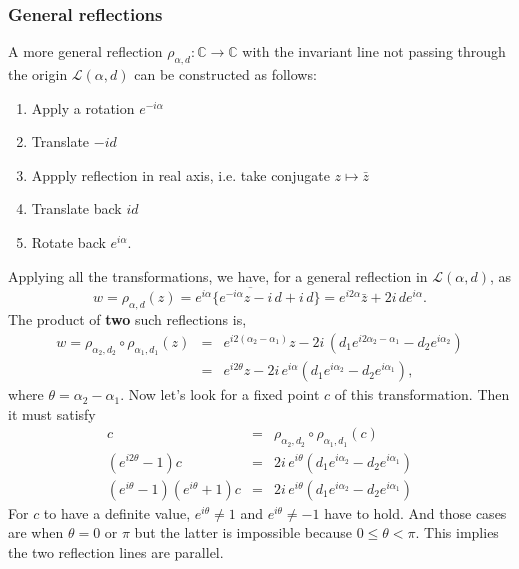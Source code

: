 \documentclass{article}
\begin{document}
\subsubsection{General reflections}
\label{sec:org0e04d08}
A more general reflection \(\rho_{\alpha,d}:\mathbb{C} \rightarrow \mathbb{C}\) with the invariant line not passing through the origin \(\mathcal{L}(\alpha, d)\) can be constructed as follows:
\begin{enumerate}
\item Apply a rotation \(e^{-i\alpha}\)
\item Translate \(-id\)
\item Appply reflection in real axis, i.e. take conjugate \(z \mapsto \bar{z}\)
\item Translate back \(id\)
\item Rotate back \(e^{i\alpha}\).
\end{enumerate}
Applying all the transformations, we have, for a general reflection in \(\mathcal{L}(\alpha, d)\), as
\begin{equation}
w = \rho_{\alpha,d} (z) = e^{i\alpha}\{ \overline{e^{-i\alpha} z - i\,d} + i\,d \} = e^{i2\alpha} \bar{z} + 2i \, de^{i\alpha}.
\end{equation}
The product of \textbf{two} such reflections is,
\begin{eqnarray}
w = \rho_{\alpha_{2}, d_{2}} \circ \rho_{\alpha_{1},d_{1}} (z) &=& e^{i2(\alpha_{2} - \alpha_{1})} z - 2i \, ( d_{1} e^{i2\alpha_{2} - \alpha_{1}} - d_{2} e^{i\alpha_{2}})  \nonumber \\
&=& e^{i2\theta} z - 2i \, e^{i\alpha}( d_{1} e^{i\alpha_{2}} - d_{2} e^{i\alpha_{1}}),
\end{eqnarray}
where \(\theta = \alpha_{2} - \alpha_{1}\). Now let's look for a fixed point \(c\) of this transformation. Then it must satisfy
\begin{eqnarray}
c &=&  \rho_{\alpha_{2}, d_{2}} \circ \rho_{\alpha_{1},d_{1}} (c) \nonumber \\
(e^{i2\theta} - 1)c &=&  2i \, e^{i\theta}( d_{1} e^{i\alpha_{2}} - d_{2} e^{i\alpha_{1}}) \nonumber  \\
(e^{i\theta} - 1)(e^{i\theta} + 1)c &=&  2i \, e^{i\theta}( d_{1} e^{i\alpha_{2}} - d_{2} e^{i\alpha_{1}}) \nonumber 
\end{eqnarray}
For \(c\) to have a definite value, \(e^{i\theta} \ne 1\) and \(e^{i\theta} \ne -1\) have to hold. And those cases are when \(\theta = 0\) or \(\pi\) but the latter is impossible because \(0 \le \theta < \pi\). 
This implies the two reflection lines are parallel.\\
\end{document}
